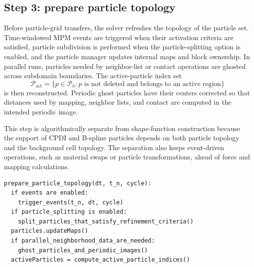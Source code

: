 \subsection{Step 3: prepare particle topology}
\label{subsec:solver-step-3}
Before particle-grid transfers, the solver refreshes the topology of the particle set.  Time-windowed MPM events are triggered when their activation criteria are satisfied, particle subdivision is performed when the particle-splitting option is enabled, and the particle manager updates internal maps and block ownership.  In parallel runs, particles needed by neighbor-list or contact operations are ghosted across subdomain boundaries.  The active-particle index set
\begin{equation}
  \mathcal{P}_{\mathrm{act}} = \{p\in\mathcal{P}_h : p\text{ is not deleted and belongs to an active region}\}
\end{equation}
is then reconstructed.  Periodic ghost particles have their centers corrected so that distances used by mapping, neighbor lists, and contact are computed in the intended periodic image.

This step is algorithmically separate from shape-function construction because the support of CPDI and B-spline particles depends on both particle topology and the background cell topology.  The separation also keeps event-driven operations, such as material swaps or particle transformations, ahead of force and mapping calculations.

\begin{lstlisting}[caption={Particle topology preparation.},basicstyle=\ttfamily\small]
prepare_particle_topology(dt, t_n, cycle):
  if events are enabled:
    trigger_events(t_n, dt, cycle)
  if particle_splitting is enabled:
    split_particles_that_satisfy_refinement_criteria()
  particles.updateMaps()
  if parallel_neighborhood_data_are_needed:
    ghost_particles_and_periodic_images()
  activeParticles = compute_active_particle_indices()
\end{lstlisting}


